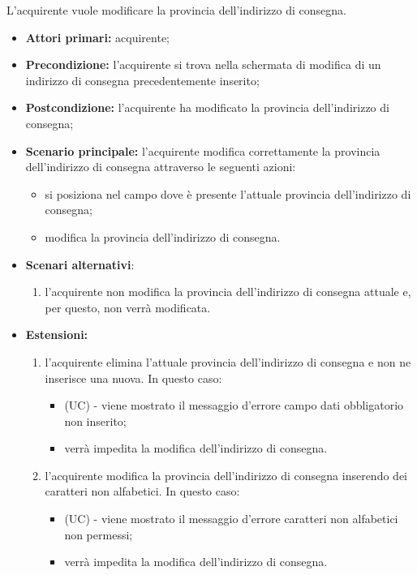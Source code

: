 L'acquirente vuole modificare la provincia dell'indirizzo di consegna.
\begin{itemize}
    \item \textbf{Attori primari:} acquirente;
    \item \textbf{Precondizione:} l'acquirente si trova nella schermata di modifica di un indirizzo di consegna precedentemente inserito;
    \item \textbf{Postcondizione:} l'acquirente ha modificato la provincia dell'indirizzo di consegna;
    \item \textbf{Scenario principale:} l'acquirente modifica correttamente la provincia dell'indirizzo di consegna attraverso le seguenti azioni:
    \begin{itemize}
        \item si posiziona nel campo dove è presente l'attuale provincia dell'indirizzo di consegna;
        \item modifica la provincia dell'indirizzo di consegna.
    \end{itemize}
    \item \textbf{Scenari alternativi}:
    \begin{enumerate}[label=\lett]
        \item l'acquirente non modifica la provincia dell'indirizzo di consegna attuale e, per questo, non verrà modificata.
    \end{enumerate}
    \item \textbf{Estensioni:}
    \begin{enumerate}[label=\lett]
        \item l'acquirente elimina l'attuale provincia dell'indirizzo di consegna e non ne inserisce una nuova. In questo caso:
        \begin{itemize}
            \item (UC) - viene mostrato il messaggio d'errore campo dati obbligatorio non inserito;
            \item verrà impedita la modifica dell'indirizzo di consegna.
        \end{itemize}
        \item l'acquirente modifica la provincia dell'indirizzo di consegna inserendo dei caratteri non alfabetici. In questo caso:
        \begin{itemize}
            \item (UC) - viene mostrato il messaggio d'errore caratteri non alfabetici non permessi;
            \item verrà impedita la modifica dell'indirizzo di consegna.
        \end{itemize}
    \end{enumerate}
\end{itemize}

